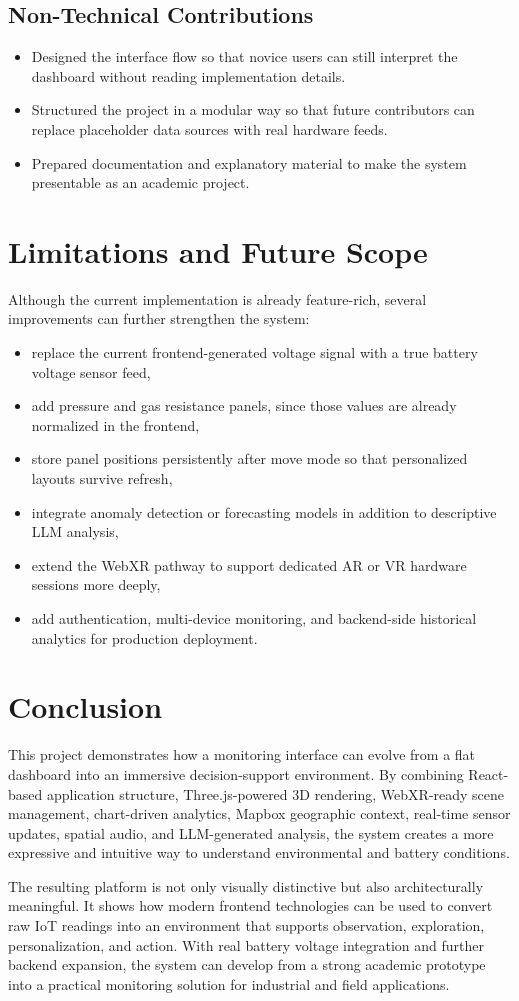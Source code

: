 \documentclass[conference]{IEEEtran}
\begin{document}
\subsection{Non-Technical Contributions}
\begin{itemize}
\item Designed the interface flow so that novice users can still interpret the dashboard without reading implementation details.
\item Structured the project in a modular way so that future contributors can replace placeholder data sources with real hardware feeds.
\item Prepared documentation and explanatory material to make the system presentable as an academic project.
\end{itemize}

\section{Limitations and Future Scope}
Although the current implementation is already feature-rich, several improvements can further strengthen the system:
\begin{itemize}
\item replace the current frontend-generated voltage signal with a true battery voltage sensor feed,
\item add pressure and gas resistance panels, since those values are already normalized in the frontend,
\item store panel positions persistently after move mode so that personalized layouts survive refresh,
\item integrate anomaly detection or forecasting models in addition to descriptive LLM analysis,
\item extend the WebXR pathway to support dedicated AR or VR hardware sessions more deeply,
\item add authentication, multi-device monitoring, and backend-side historical analytics for production deployment.
\end{itemize}

\section{Conclusion}
This project demonstrates how a monitoring interface can evolve from a flat dashboard into an immersive decision-support environment. By combining React-based application structure, Three.js-powered 3D rendering, WebXR-ready scene management, chart-driven analytics, Mapbox geographic context, real-time sensor updates, spatial audio, and LLM-generated analysis, the system creates a more expressive and intuitive way to understand environmental and battery conditions.

The resulting platform is not only visually distinctive but also architecturally meaningful. It shows how modern frontend technologies can be used to convert raw IoT readings into an environment that supports observation, exploration, personalization, and action. With real battery voltage integration and further backend expansion, the system can develop from a strong academic prototype into a practical monitoring solution for industrial and field applications.

\balance
\end{document}
